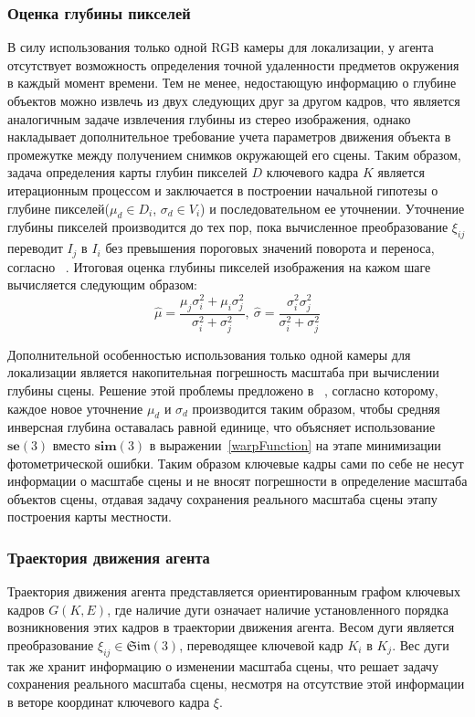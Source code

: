 \subsubsection{Оценка глубины пикселей}
В силу использования только одной RGB камеры для локализации, у агента отсутствует возможность определения точной удаленности предметов окружения в каждый момент времени. Тем не менее, недостающую информацию о глубине объектов можно извлечь из двух следующих друг за другом кадров, что является аналогичным задаче извлечения глубины из стерео изображения, однако накладывает дополнительное требование учета параметров движения объекта в промежутке между получением снимков окружающей его сцены. Таким образом, задача определения карты глубин пикселей $D$ ключевого кадра $K$ является итерационным процессом и заключается в построении начальной гипотезы о глубине пикселей($\mu_d \in D_i$, $\sigma_d \in V_i$) и последовательном ее уточнении. Уточнение глубины пикселей производится до тех пор, пока вычисленное преобразование $\xi_{ij}$ переводит $I_j$ в $I_i$ без превышения пороговых значений поворота и переноса, согласно ~\cite{tumDepthEstimation, tum3DMonoSLAM}. Итоговая оценка глубины пикселей изображения на кажом шаге вычисляется следующим образом:
\begin{equation}
    \hat \mu = \frac{\mu_j\sigma^2_i + \mu_i\sigma^2_j}{\sigma^2_i + \sigma^2_j},~\hat \sigma = \frac{\sigma^2_i\sigma^2_j}{\sigma^2_i+\sigma^2_j}
    \label{depthUpdate}
\end{equation}


Дополнительной особенностью использования только одной камеры для локализации является накопительная погрешность масштаба при вычислении глубины сцены. Решение этой проблемы предложено в ~\cite{tum3DMonoSLAM}, согласно которому, каждое новое уточнение $\mu_d$ и $\sigma_d$ производится таким образом, чтобы средняя инверсная глубина оставалась равной единице, что объясняет использование $\textbf{se}(3)$ вместо $\textbf{sim}(3)$ в выражении~\ref{warpFunction} на этапе минимизации фотометрической ошибки. Таким образом ключевые кадры сами по себе не несут информации о масштабе сцены и не вносят погрешности в определение масштаба объектов сцены, отдавая задачу сохранения реального масштаба сцены этапу построения карты местности.


\subsubsection{Траектория движения агента}
Траектория движения агента представляется ориентированным графом ключевых кадров $G(K, E)$, где наличие дуги означает наличие установленного порядка возникновения этих кадров в траектории движения агента. Весом дуги является преобразование $\xi_{ij} \in \mathfrak{Sim}(3)$, переводящее ключевой кадр $K_i$ в $K_j$. Вес дуги так же хранит информацию о изменении масштаба сцены, что решает задачу сохранения реального масштаба сцены, несмотря на отсутствие этой информации в веторе координат ключевого кадра $\xi$. 


